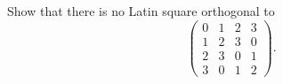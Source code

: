 Show that there is no Latin square orthogonal to
$$
\begin{pmatrix}
0 & 1 & 2 & 3 \\
1 & 2 & 3 & 0 \\
2 & 3 & 0 & 1 \\
3 & 0 & 1 & 2
\end{pmatrix}.
$$
